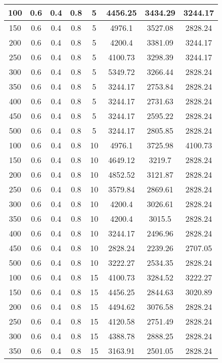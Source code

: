\documentclass[a4paper, 12pt]{extreport}
\begin{document}
\begin{itemize}
\begin{longtable}{|c|c|c|c|c|c|c|c|}
			100 & 0.6 & 0.4 & 0.8 & 5 & 4456.25 & 3434.29 & 3244.17 \\\hline
			150 & 0.6 & 0.4 & 0.8 & 5 & 4976.1 & 3527.08 & 2828.24 \\\hline
			200 & 0.6 & 0.4 & 0.8 & 5 & 4200.4 & 3381.09 & 3244.17 \\\hline
			250 & 0.6 & 0.4 & 0.8 & 5 & 4100.73 & 3298.39 & 3244.17 \\\hline
			300 & 0.6 & 0.4 & 0.8 & 5 & 5349.72 & 3266.44 & 2828.24 \\\hline
			350 & 0.6 & 0.4 & 0.8 & 5 & 3244.17 & 2753.84 & 2828.24 \\\hline
			400 & 0.6 & 0.4 & 0.8 & 5 & 3244.17 & 2731.63 & 2828.24 \\\hline
			450 & 0.6 & 0.4 & 0.8 & 5 & 3244.17 & 2595.22 & 2828.24 \\\hline
			500 & 0.6 & 0.4 & 0.8 & 5 & 3244.17 & 2805.85 & 2828.24 \\\hline
			100 & 0.6 & 0.4 & 0.8 & 10 & 4976.1 & 3725.98 & 4100.73 \\\hline
			150 & 0.6 & 0.4 & 0.8 & 10 & 4649.12 & 3219.7 & 2828.24 \\\hline
			200 & 0.6 & 0.4 & 0.8 & 10 & 4852.52 & 3121.87 & 2828.24 \\\hline
			250 & 0.6 & 0.4 & 0.8 & 10 & 3579.84 & 2869.61 & 2828.24 \\\hline
			300 & 0.6 & 0.4 & 0.8 & 10 & 4200.4 & 3026.61 & 2828.24 \\\hline
			350 & 0.6 & 0.4 & 0.8 & 10 & 4200.4 & 3015.5 & 2828.24 \\\hline
			400 & 0.6 & 0.4 & 0.8 & 10 & 3244.17 & 2496.96 & 2828.24 \\\hline
			450 & 0.6 & 0.4 & 0.8 & 10 & 2828.24 & 2239.26 & 2707.05 \\\hline
			500 & 0.6 & 0.4 & 0.8 & 10 & 3222.27 & 2534.35 & 2828.24 \\\hline
			100 & 0.6 & 0.4 & 0.8 & 15 & 4100.73 & 3284.52 & 3222.27 \\\hline
			150 & 0.6 & 0.4 & 0.8 & 15 & 4456.25 & 2844.63 & 3020.89 \\\hline
			200 & 0.6 & 0.4 & 0.8 & 15 & 4494.62 & 3076.58 & 2828.24 \\\hline
			250 & 0.6 & 0.4 & 0.8 & 15 & 4120.58 & 2751.49 & 2828.24 \\\hline
			300 & 0.6 & 0.4 & 0.8 & 15 & 4388.78 & 2888.25 & 2828.24 \\\hline
			350 & 0.6 & 0.4 & 0.8 & 15 & 3163.91 & 2501.05 & 2828.24 \\\hline

\end{longtable}
\end{itemize}
\end{document}
